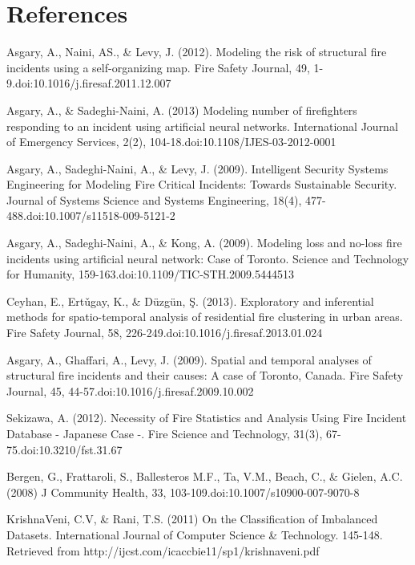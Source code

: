 \documentclass[12pt,letterpaper, oneside]
{article}
\begin{document}
\section{References}
{\parindent0pt
\medskip Asgary, A., Naini, AS., \& Levy, J. (2012). Modeling the risk of structural fire incidents using a self-organizing map. Fire Safety Journal, 49, 1-9.doi:10.1016/j.firesaf.2011.12.007

\medskip Asgary, A., \& Sadeghi-Naini, A. (2013) Modeling number of firefighters responding to an incident using artificial neural networks. International Journal of Emergency Services, 2(2), 104-18.doi:10.1108/IJES-03-2012-0001

\medskip Asgary, A., Sadeghi-Naini, A., \& Levy, J. (2009). Intelligent Security Systems Engineering for Modeling Fire Critical Incidents: Towards Sustainable Security. Journal of Systems Science and Systems Engineering, 18(4), 477-488.doi:10.1007/s11518-009-5121-2

\medskip Asgary, A., Sadeghi-Naini, A., \& Kong, A. (2009). Modeling loss and no-loss fire incidents using artificial neural network: Case of Toronto. Science and Technology for Humanity, 159-163.doi:10.1109/TIC-STH.2009.5444513

\medskip Ceyhan, E., Ert\v{u}gay, K., \& Düzgün, Ş. (2013). Exploratory and inferential methods for spatio-temporal analysis of residential fire clustering in urban areas. Fire Safety Journal, 58, 226-249.doi:10.1016/j.firesaf.2013.01.024

\medskip Asgary, A., Ghaffari, A., Levy, J. (2009). Spatial and temporal analyses of structural fire incidents and their causes: A case of Toronto, Canada. Fire Safety Journal, 45, 44-57.doi:10.1016/j.firesaf.2009.10.002

\medskip Sekizawa, A. (2012). Necessity of Fire Statistics and Analysis Using Fire Incident Database - Japanese Case -. Fire Science and Technology, 31(3), 67-75.doi:10.3210/fst.31.67

\medskip Bergen, G., Frattaroli, S., Ballesteros M.F., Ta, V.M., Beach, C., \& Gielen, A.C. (2008) J Community Health, 33, 103-109.doi:10.1007/s10900-007-9070-8

\medskip KrishnaVeni, C.V, \& Rani, T.S. (2011) On the Classification of Imbalanced Datasets. International Journal of Computer Science \& Technology. 145-148. Retrieved from http://ijcst.com/icaccbie11/sp1/krishnaveni.pdf

}
\end{document}
